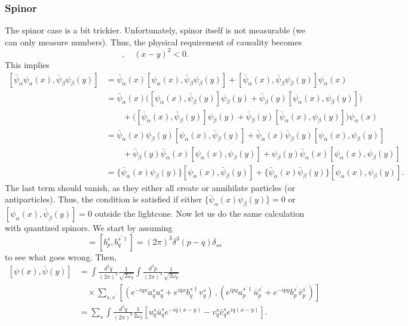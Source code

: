 \documentclass[11pt]{article}
\theoremstyle{definition}
\begin{document}
\subsubsection{Spinor}
The spinor case is a bit trickier. Unfortunately, spinor itself is not measurable (we can only measure numbers). Thus, the physical requirement of causality becomes
\begin{equation}
    [\bar{\psi}\psi(x), \bar{\psi}\psi(y)], \quad (x-y)^2 <0.
\end{equation}
This implies
\begin{equation}
    \begin{aligned}
        [\bar{\psi}_\alpha\psi_\alpha(x), \bar{\psi}_\beta\psi_\beta(y)] &=\bar{\psi}_\alpha(x)[\psi_\alpha(x), \bar{\psi}_\beta\psi_\beta(y)] + [\bar{\psi}_\alpha(x), \bar{\psi}_\beta\psi_\beta(y)]\psi_\alpha(x) \\
        &=\bar{\psi}_\alpha(x)\bigg([\psi_\alpha(x), \bar{\psi}_\beta(y)]\psi_\beta(y) + \bar{\psi}_\beta(y)[\psi_\alpha(x), \psi_\beta(y)]\bigg) \\
        &\qquad  + \bigg([\bar{\psi}_\alpha(x), \bar{\psi}_\beta(y)]\psi_\beta(y) + \bar{\psi}_\beta(y)[\bar{\psi}_\alpha(x), \psi_\beta(y)]\bigg)\psi_\alpha(x) \\
        &= \bar{\psi}_\alpha(x)\psi_\beta(y)[\psi_\alpha(x), \bar{\psi}_\beta(y)] + \bar{\psi}_\alpha(x)\bar{\psi}_\beta(y)[\psi_\alpha(x), \psi_\beta(y)] \\
        & \qquad + \bar{\psi}_\beta(y)\bar{\psi}_\alpha(x)[\psi_\alpha(x), \psi_\beta(y)] + \psi_\beta(y)\bar{\psi}_\alpha(x)[\psi_\alpha(x), \psi_\beta(y)] \\
        &= \{\bar{\psi}_\alpha(x)\psi_\beta(y)\}[\psi_\alpha(x), \bar{\psi}_\beta(y)] + \{\bar{\psi}_\alpha(x)\bar{\psi}_\beta(y)\}[\psi_\alpha(x), \psi_\beta(y)].
    \end{aligned}
\end{equation}
The last term should vanish, as they either all create or annihilate particles (or antiparticles). Thus, the condition is satisfied if either $\{\bar{\psi}_\alpha(x)\psi_\beta(y)\}=0$ or $[\psi_\alpha(x), \bar{\psi}_\beta(y)]=0$ outside the lightcone.
Now let us do the same calculation with quantized spinors. We start by assuming
\begin{equation}
[a^{s}_{p},a^{s^{\prime}\dagger}_{q}]=[b^{s}_{p},b^{s^{\prime}\dagger}_{q}]=(2\pi)^{3}\delta^{3}(p-q)\delta_{ss^{\prime}}
\end{equation}
to see what goes wrong. Then,
\begin{equation}
\begin{aligned}
[\psi(x),\bar{\psi}(y)] &= \int\frac{d^{3}q}{(2\pi)^{3}}\frac{1}{\sqrt{2\omega_{q}}}\int\frac{d^{3}p}{(2\pi)^{3}}\frac{1}{\sqrt{2\omega_{p}}} \\
&\quad \times\sum_{s,s^{\prime}}\left[(e^{-iqx}a^{s}_{q}u^{s}_{q}+e^{iqx}b^{s\dagger}_{q}v^{s}_{q})\,,(e^{ipy}a^{s^{\prime}\dagger}_{p}\bar{u}^{s^{\prime}}_{p}+e^{-ipy}b^{s^{\prime}}_{p}\bar{v}^{s^{\prime}}_{p})\right] \\
&= \sum_{s}\int\frac{d^{3}q}{(2\pi)^{3}}\frac{1}{2\omega_{q}}\left[u^{s}_{q}\bar{u}^{s}_{q}e^{-iq(x-y)}-v^{s}_{q}\bar{v}^{s}_{q}e^{iq(x-y)}\right].
\end{aligned}
\end{equation}
\end{document}
